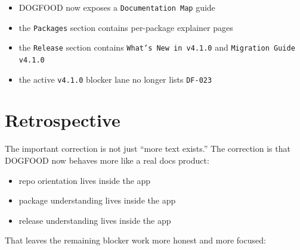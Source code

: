\begin{itemize}
\tightlist
\item
  DOGFOOD now exposes a \texttt{D\allowbreak{}o\allowbreak{}c\allowbreak{}u\allowbreak{}m\allowbreak{}e\allowbreak{}n\allowbreak{}t\allowbreak{}a\allowbreak{}t\allowbreak{}i\allowbreak{}o\allowbreak{}n\allowbreak{} \allowbreak{}M\allowbreak{}a\allowbreak{}p} guide
\item
  the \texttt{P\allowbreak{}a\allowbreak{}c\allowbreak{}k\allowbreak{}a\allowbreak{}g\allowbreak{}e\allowbreak{}s} section contains per-package explainer pages
\item
  the \texttt{R\allowbreak{}e\allowbreak{}l\allowbreak{}e\allowbreak{}a\allowbreak{}s\allowbreak{}e} section contains \texttt{W\allowbreak{}h\allowbreak{}a\allowbreak{}t\allowbreak{}'\allowbreak{}s\allowbreak{} \allowbreak{}N\allowbreak{}e\allowbreak{}w\allowbreak{} \allowbreak{}i\allowbreak{}n\allowbreak{} \allowbreak{}v\allowbreak{}4\allowbreak{}.\allowbreak{}1\allowbreak{}.\allowbreak{}0} and \texttt{M\allowbreak{}i\allowbreak{}g\allowbreak{}r\allowbreak{}a\allowbreak{}t\allowbreak{}i\allowbreak{}o\allowbreak{}n\allowbreak{} \allowbreak{}G\allowbreak{}u\allowbreak{}i\allowbreak{}d\allowbreak{}e\allowbreak{} \allowbreak{}v\allowbreak{}4\allowbreak{}.\allowbreak{}1\allowbreak{}.\allowbreak{}0}
\item
  the active \texttt{v\allowbreak{}4\allowbreak{}.\allowbreak{}1\allowbreak{}.\allowbreak{}0} blocker lane no longer lists \texttt{D\allowbreak{}F\allowbreak{}-\allowbreak{}0\allowbreak{}2\allowbreak{}3}
\end{itemize}

\section{Retrospective}\label{record-084-retrospective}

The important correction is not just ``more text exists.'' The correction is that DOGFOOD now behaves more like a real docs product:

\begin{itemize}
\tightlist
\item
  repo orientation lives inside the app
\item
  package understanding lives inside the app
\item
  release understanding lives inside the app
\end{itemize}

That leaves the remaining blocker work more honest and more focused:

